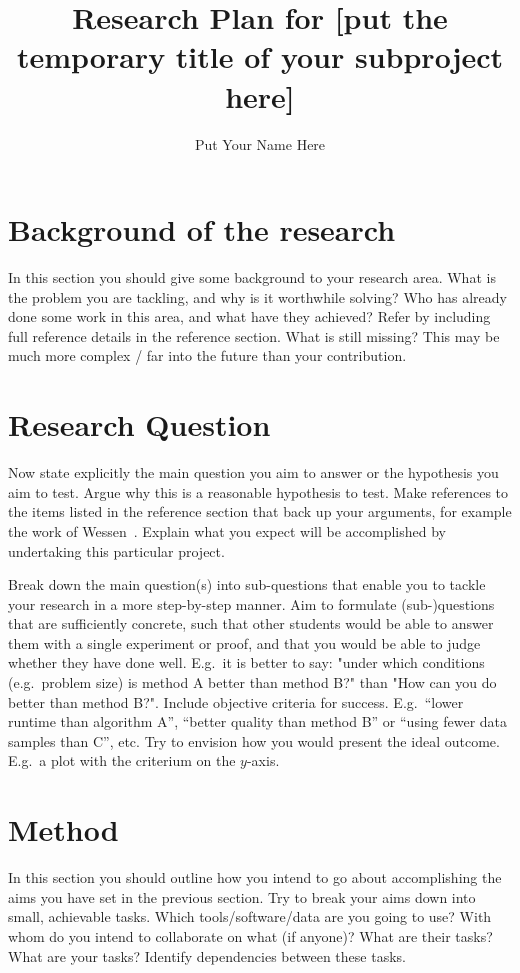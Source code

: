 \documentclass[english]{article}
\title{Research Plan for [put the temporary title of your subproject here]}
\author{Put Your Name Here}
\begin{document}
\maketitle


\section*{Background of the research}
In this section you should give some background to your
research area. What is the problem you are tackling, and why is it
worthwhile solving? Who has already done some work in this area,
and what have they achieved? Refer by including full reference details in the reference section.
What is still missing? This may be much more complex / far into the future than your contribution.


\section*{Research Question}
Now state explicitly the main question you aim to answer or the hypothesis you aim to
test. 
Argue why this is a reasonable hypothesis to test.
Make references to the items listed in the reference section
that back up your arguments, for example the work of Wessen~\cite{wessen}.
Explain what you expect will be accomplished by undertaking this
particular project.  

Break down the main question(s) into sub-questions that enable you to tackle your research in a more step-by-step manner.
Aim to formulate (sub-)questions that are sufficiently concrete, such that other students would be able to answer them with a single experiment or proof, and that you would be able to judge whether they have done well. E.g.\ it is better to say: "under which conditions (e.g.\ problem size) is method A better than method B?" than "How can you do better than method B?". Include objective criteria for success. E.g.\ ``lower runtime than algorithm A'', ``better quality than method B'' or ``using fewer data samples than C'', etc. Try to envision how you would present the ideal outcome. E.g.\ a plot with the criterium on the $y$-axis.

\section*{Method}
In this section you should outline how you intend to go
about accomplishing the aims you have set in the previous
section. Try to break your aims down into small, achievable tasks. 
Which tools/software/data are you going to use? With whom do you intend to collaborate on what (if anyone)? What are their tasks? What are your tasks?
Identify dependencies between these tasks.
\end{document}
